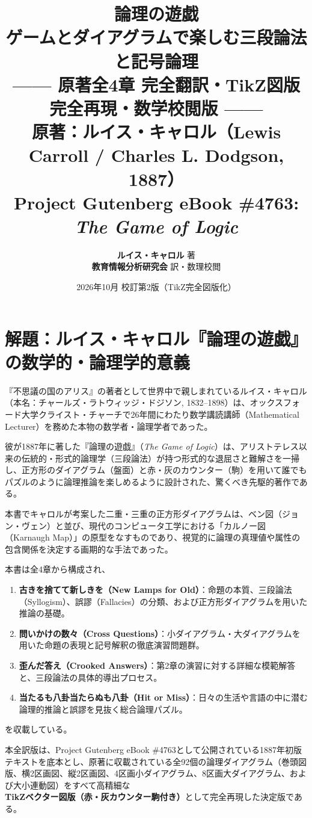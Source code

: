\documentclass[a4paper,11pt,openany]{ltjsbook}
\title{\Huge\textbf{論理の遊戯}\\[4mm]
\huge\textbf{ゲームとダイアグラムで楽しむ三段論法と記号論理}\\[6mm]
\Large\textbf{—— 原著全4章 完全翻訳・TikZ図版完全再現・数学校閲版 ——}\\[5mm]
\large 原著：ルイス・キャロル（Lewis Carroll / Charles L. Dodgson, 1887）\\[2mm]
\normalsize Project Gutenberg eBook \#4763: \textit{The Game of Logic}}
\author{\textbf{ルイス・キャロル} 著\\[2mm]
\textbf{教育情報分析研究会} 訳・数理校閲}
\date{2026年10月 校訂第2版（TikZ完全図版化）}
\begin{document}
\maketitle

\frontmatter

\chapter*{解題：ルイス・キャロル『論理の遊戯』の数学的・論理学的意義}

『不思議の国のアリス』の著者として世界中で親しまれているルイス・キャロル（本名：チャールズ・ラトウィッジ・ドジソン, 1832--1898）は、オックスフォード大学クライスト・チャーチで26年間にわたり数学講読講師（Mathematical Lecturer）を務めた本物の数学者・論理学者であった。

彼が1887年に著した『論理の遊戯』（\textit{The Game of Logic}）は、アリストテレス以来の伝統的・形式的論理学（三段論法）が持つ形式的な退屈さと難解さを一掃し、正方形のダイアグラム（盤面）と赤・灰のカウンター（駒）を用いて誰でもパズルのように論理推論を楽しめるように設計された、驚くべき先駆的著作である。

本書でキャロルが考案した二重・三重の正方形ダイアグラムは、ベン図（ジョン・ヴェン）と並び、現代のコンピュータ工学における「カルノー図（Karnaugh Map）」の原型をなすものであり、視覚的に論理の真理値や属性の包含関係を決定する画期的な手法であった。

本書は全4章から構成され、
\begin{enumerate}[label=\textbf{第\arabic*章:}]
    \item \textbf{古きを捨てて新しきを（New Lamps for Old）}：命題の本質、三段論法（Syllogism）、誤謬（Fallacies）の分類、および正方形ダイアグラムを用いた推論の基礎。
    \item \textbf{問いかけの数々（Cross Questions）}：小ダイアグラム・大ダイアグラムを用いた命題の表現と記号解釈の徹底演習問題群。
    \item \textbf{歪んだ答え（Crooked Answers）}：第2章の演習に対する詳細な模範解答と、三段論法の具体的導出プロセス。
    \item \textbf{当たるも八卦当たらぬも八卦（Hit or Miss）}：日々の生活や言語の中に潜む論理的推論と誤謬を見抜く総合論理パズル。
\end{enumerate}
を収載している。

本全訳版は、Project Gutenberg eBook \#4763として公開されている1887年初版テキストを底本とし、原著に収載されている全92個の論理ダイアグラム（巻頭図版、横2区画図、縦2区画図、4区画小ダイアグラム、8区画大ダイアグラム、および大小連動図）をすべて高精細な\textbf{TikZベクター図版（赤・灰カウンター駒付き）}として完全再現した決定版である。
\end{document}
